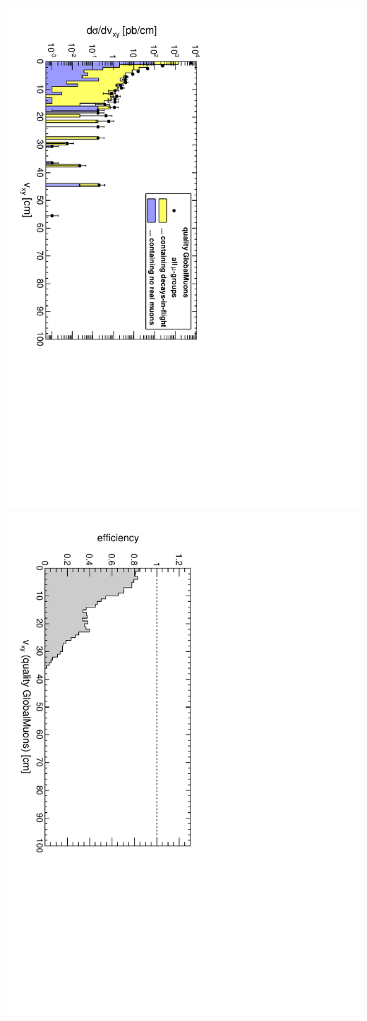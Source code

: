 \documentclass[compress]{beamer}
\begin{document}
\begin{frame}
\begin{center}
{\includegraphics[height=0.45\linewidth, angle=90]{dispvert_QualityGlobalMuonAny.pdf}
\includegraphics[height=0.45\linewidth, angle=90]{dispvert_eff_QualityGlobalMuonAny.pdf}}
\end{center}
\end{frame}

\end{document}
